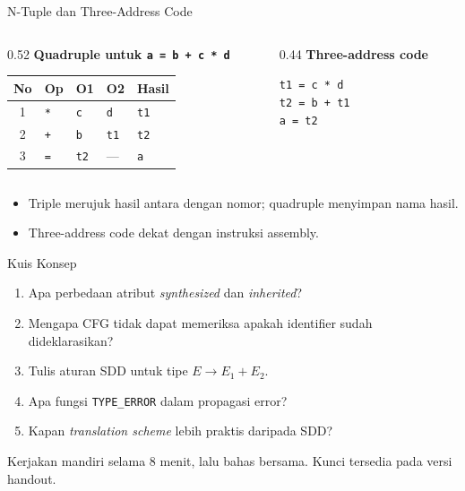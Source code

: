 \documentclass[aspectratio=169,10pt,t]{beamer}
\begin{document}
\begin{frame}{N-Tuple dan Three-Address Code}
  \begin{columns}[T,onlytextwidth]
    \begin{column}{0.52\textwidth}
      \textbf{Quadruple untuk \texttt{a = b + c * d}}
      \scriptsize
      \setlength{\tabcolsep}{3pt}
      \begin{tabular}{@{}c l l l l@{}}
        \toprule
        \textbf{No} & \textbf{Op} & \textbf{O1} & \textbf{O2} &
        \textbf{Hasil} \\
        \midrule
        1 & \texttt{*} & \texttt{c} & \texttt{d} & \texttt{t1} \\
        2 & \texttt{+} & \texttt{b} & \texttt{t1} & \texttt{t2} \\
        3 & \texttt{=} & \texttt{t2} & --- & \texttt{a} \\
        \bottomrule
      \end{tabular}
    \end{column}
    \begin{column}{0.44\textwidth}
      \textbf{Three-address code}
      \begin{block}{}
        \footnotesize
        \texttt{t1 = c * d}\\
        \texttt{t2 = b + t1}\\
        \texttt{a = t2}
      \end{block}
    \end{column}
  \end{columns}

  \vspace{4pt}
  \begin{itemize}
    \item Triple merujuk hasil antara dengan nomor; quadruple menyimpan
          nama hasil.
    \item Three-address code dekat dengan instruksi assembly.
  \end{itemize}
\end{frame}

\begin{frame}{Kuis Konsep}
  \small
  \begin{enumerate}
    \setlength{\itemsep}{3pt}
    \item Apa perbedaan atribut \textit{synthesized} dan
          \textit{inherited}?
    \item Mengapa CFG tidak dapat memeriksa apakah identifier sudah
          dideklarasikan?
    \item Tulis aturan SDD untuk tipe \(E \to E_1+E_2\).
    \item Apa fungsi \texttt{TYPE\_ERROR} dalam propagasi error?
    \item Kapan \textit{translation scheme} lebih praktis daripada SDD?
  \end{enumerate}

  \vspace{4pt}
  {\footnotesize\color{ubbblue!75}Kerjakan mandiri selama 8 menit,
  lalu bahas bersama. Kunci tersedia pada versi handout.}
\end{frame}
\end{document}
